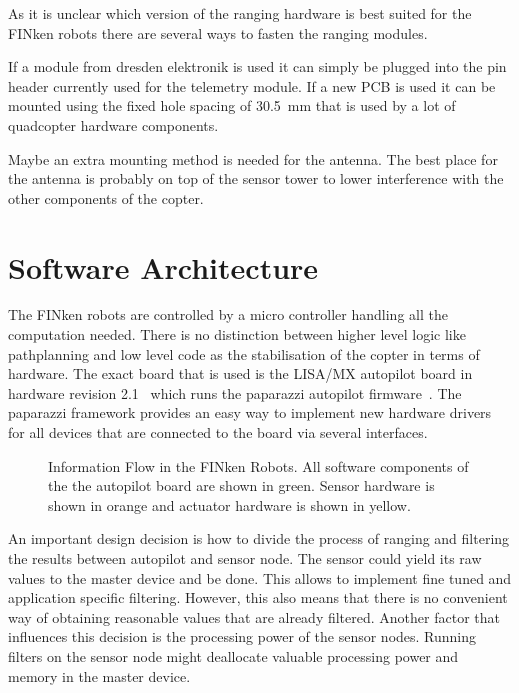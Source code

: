 As it is unclear which version of the ranging hardware is best suited for the FINken robots there are several ways to fasten the ranging modules.

If a module from dresden elektronik is used it can simply be plugged into the pin header currently used for the telemetry module.
If a new PCB is used it can be mounted using the fixed hole spacing of \SI{30.5}{mm} that is used by a lot of quadcopter hardware components.

Maybe an extra mounting method is needed for the antenna.
The best place for the antenna is probably on top of the sensor tower to lower interference with the other components of the copter.

\section{Software Architecture}
The FINken robots are controlled by a micro controller handling all the computation needed.
There is no distinction between higher level logic like pathplanning and low level code as the stabilisation of the copter in terms of hardware.
The exact board that is used is the LISA/MX autopilot board in hardware revision 2.1~\cite{lisamx} which runs the paparazzi autopilot firmware~\cite{paparazzi}.
The paparazzi framework provides an easy way to implement new hardware drivers for all devices that are connected to the board via several interfaces.

\begin{figure}[H]
	\centering	
	\label{flow}
	\caption[ Information Flow in the FINken Robots ]
	{Information Flow in the FINken Robots. 
	All software components of the the autopilot board are shown in green.
	Sensor hardware is shown in orange and actuator hardware is shown in yellow.}
\end{figure}

 

An important design decision is how to divide the process of ranging and filtering the results between autopilot and sensor node.
The sensor could yield its raw values to the master device and be done.
This allows to implement fine tuned and application specific filtering.
However, this also means that there is no convenient way of obtaining reasonable values that are already filtered.
Another factor that influences this decision is the processing power of the sensor nodes.
Running filters on the sensor node might deallocate valuable processing power and memory in the master device.

